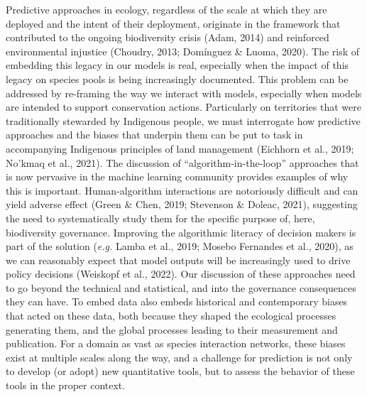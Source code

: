 \documentclass[11pt]{article}
\begin{document}
Predictive approaches in ecology, regardless of the scale at which they
are deployed and the intent of their deployment, originate in the
framework that contributed to the ongoing biodiversity crisis (Adam,
2014) and reinforced environmental injustice (Choudry, 2013; Domínguez
\& Luoma, 2020). The risk of embedding this legacy in our models is
real, especially when the impact of this legacy on species pools is
being increasingly documented. This problem can be addressed by
re-framing the way we interact with models, especially when models are
intended to support conservation actions. Particularly on territories
that were traditionally stewarded by Indigenous people, we must
interrogate how predictive approaches and the biases that underpin them
can be put to task in accompanying Indigenous principles of land
management (Eichhorn et al., 2019; No'kmaq et al., 2021). The discussion
of ``algorithm-in-the-loop'' approaches that is now pervasive in the
machine learning community provides examples of why this is important.
Human-algorithm interactions are notoriously difficult and can yield
adverse effect (Green \& Chen, 2019; Stevenson \& Doleac, 2021),
suggesting the need to systematically study them for the specific
purpose of, here, biodiversity governance. Improving the algorithmic
literacy of decision makers is part of the solution (\emph{e.g.} Lamba
et al., 2019; Mosebo Fernandes et al., 2020), as we can reasonably
expect that model outputs will be increasingly used to drive policy
decisions (Weiskopf et al., 2022). Our discussion of these approaches
need to go beyond the technical and statistical, and into the governance
consequences they can have. To embed data also embeds historical and
contemporary biases that acted on these data, both because they shaped
the ecological processes generating them, and the global processes
leading to their measurement and publication. For a domain as vast as
species interaction networks, these biases exist at multiple scales
along the way, and a challenge for prediction is not only to develop (or
adopt) new quantitative tools, but to assess the behavior of these tools
in the proper context.
\end{document}
